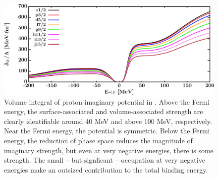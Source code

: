 \begin{figure}[tb]
    \centering
    \includegraphics[width=\textwidth]{figures/ca40_protonVolumeIntegrals.png}
    \caption[Volume integral of proton imaginary potential in \caForty]
    {
        Volume integral of proton imaginary potential in \caForty. Above the
        Fermi energy, the surface-associated and volume-associated strength
        are clearly identifiable around 40 MeV and above 100 MeV,
        respectively. Near the Fermi energy, the potential is symmetric.
        Below the Fermi energy, the reduction of phase space reduces the
        magnitude of imaginary strength, but even at very negative energies,
        there is some strength. The small -- but signficant -- occupation at
        very negative energies make an outsized contribution to the total
        binding energy.
    }
    \label{Ca40ProtonVolumeIntegral}
\end{figure}

